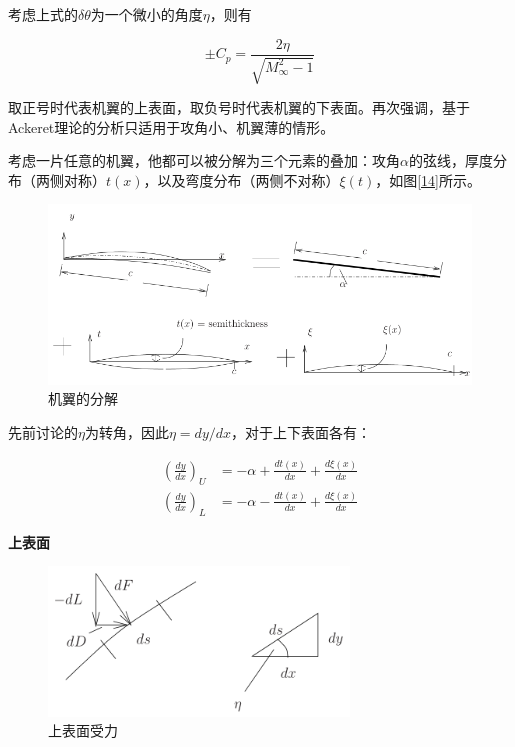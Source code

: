 考虑上式的$\delta\theta$为一个微小的角度$\eta$，则有

\begin{equation*}
    \pm C_{p}=\frac{2 \eta}{\sqrt{M_{\infty}^{2}-1}}
\end{equation*}

取正号时代表机翼的上表面，取负号时代表机翼的下表面。再次强调，基于Ackeret理论的分析只适用于攻角小、机翼薄的情形。

考虑一片任意的机翼，他都可以被分解为三个元素的叠加：攻角$\alpha$的弦线，厚度分布（两侧对称）$t(x)$，以及弯度分布（两侧不对称）$\xi(t)$，如图\ref{14}所示。

\begin{figure}[!ht]
    \centering
    \includegraphics[width=\linewidth]{figures/17.png}
    \caption{机翼的分解}
    \label{17}
\end{figure}

先前讨论的$\eta$为转角，因此$\eta=dy/dx$，对于上下表面各有：

\begin{align*}
    \left(\frac{d y}{d x}\right)_{U}&=-\alpha+\frac{d t(x)}{d x}+\frac{d \xi(x)}{d x}\\ 
    \left(\frac{d y}{d x}\right)_{L}&=-\alpha-\frac{d t(x)}{d x}+\frac{d \xi(x)}{d x}
\end{align*}

\textbf{上表面}

\begin{figure}[!ht]
    \centering
    \includegraphics[width=8cm]{figures/18.png}
    \caption{上表面受力}
    \label{18}
\end{figure}

